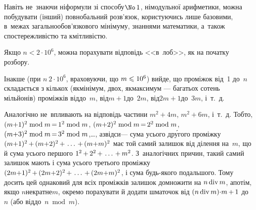 \documentclass[14pt,a4paper]{extarticle}
\def\dib#1{\,#1\discretionary{}{\mbox{$#1$}}{}\,}
\begin{document}
Навіть не~знаючи ні\nolinebreak[2] формули зі способу\nolinebreak[3] $\No\,1$, ні\nolinebreak[2] модульної арифметики, можна побудувати (інший) повнобальний розв'язок, користуючись лише базовими, в~межах загальнообов'язкового мінімуму, знаннями математики, а~також спостережливістю та кмітливістю.

Якщо $n < 2{\cdot}10^6$, можна порахувати відповідь <<в~лоб>>, як на початку розбору.

Інакше (при $n \> 2{\cdot}10^6$, враховуючи, що ${m\leqslant10^6}$) вийде, що проміжок від~1 до~$n$ складається з кількох (як\nolinebreak[3] мінімум, двох, як\nolinebreak[3] максимум --- багатьох сотень мільйонів) проміжків від\nolinebreak[2] до~$m$, від\nolinebreak[2] ${m{+}1}$\nolinebreak[2] до~$2m$, від\nolinebreak[2] ${2m{+}1}$\nolinebreak[2] до~$3m$, і~т.~д.

\vspace{0.375\baselineskip}


Аналогічно не~впливають на відповідь частини  ${m^2{+}4m}$,  ${m^2{+}6m}$, і~т.~д. Тобто, 
${(m{+}1)^2\bmod m}\dib{{=}}{1^2\bmod m}$,
${(m{+}2)^2\bmod m}\dib{{=}}{2^2\bmod m}$,
${(m{+}3)^2\bmod m}\dib{{=}}{3^2\bmod m}$,\nolinebreak[3] \dots, 
а\nolinebreak[2] звідси\nolinebreak[3] --- сума усього др\'{у}гого проміжку $(m{+}1)^2\dib{{+}}(m{+}2)^2\dib{{+}}\dots\dib{{+}}(m{+}m)^2$ має той самий залишок від ділення на~$m$, що й сума усього першого $1^2\dib{{+}}2^2\dib{{+}}\dots\dib{{+}}m^2$. 
З~аналогічних причин, такий самий залишок %
мають і сума усього третього проміжку $(2m{+}1)^2\dib{{+}}(2m{+}2)^2\dib{{+}}\dots\dib{{+}}(2m{+}m)^2$, і сума будь-якого подальшого. Тому досить цей однаковий для всіх проміжків залишок домножити на ${n\mathop{\rm div}\nolimits m}$, а\nolinebreak[3] потім, якщо %
$n$\nolinebreak[2] не\nolinebreak[3] кратне\nolinebreak[3] $m$, окремо порахувати й додати шматочок від ${(n\bdiv m){\cdot}m}\dib{{+}}1$ до~$n$ (або від\nolinebreak[2] до~$n\bmod m$). 
\end{document}
